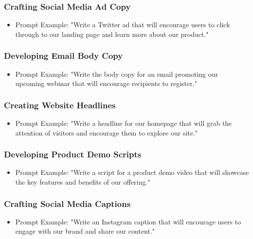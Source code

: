 \begin{frame}[fragile]\frametitle{Crafting Social Media Ad Copy}
\begin{itemize}
\item Prompt Example: "Write a Twitter ad that will encourage users to click through to our landing page and learn more about our product."
\end{itemize}
\end{frame}

\begin{frame}[fragile]\frametitle{Developing Email Body Copy}
\begin{itemize}
\item Prompt Example: "Write the body copy for an email promoting our upcoming webinar that will encourage recipients to register."
\end{itemize}
\end{frame}

\begin{frame}[fragile]\frametitle{Creating Website Headlines}
\begin{itemize}
\item Prompt Example: "Write a headline for our homepage that will grab the attention of visitors and encourage them to explore our site."
\end{itemize}
\end{frame}

\begin{frame}[fragile]\frametitle{Developing Product Demo Scripts}
\begin{itemize}
\item Prompt Example: "Write a script for a product demo video that will showcase the key features and benefits of our offering."
\end{itemize}
\end{frame}

\begin{frame}[fragile]\frametitle{Crafting Social Media Captions}
\begin{itemize}
\item Prompt Example: "Write an Instagram caption that will encourage users to engage with our brand and share our content."
\end{itemize}
\end{frame}

